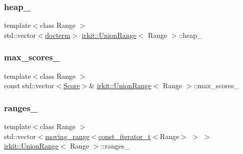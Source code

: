 \subsubsection{\texorpdfstring{heap\+\_\+}{heap\_}}
{\footnotesize\ttfamily template$<$class Range $>$ \\
std\+::vector$<$\hyperlink{structirkit_1_1UnionRange_1_1docterm}{docterm}$>$ \hyperlink{classirkit_1_1UnionRange}{irkit\+::\+Union\+Range}$<$ Range $>$\+::heap\+\_\+\hspace{0.3cm}{\ttfamily [protected]}}

\mbox{\label{classirkit_1_1UnionRange_a980f7cfaf14c7c4d93b13b6d7ce6a859}} 
\subsubsection{\texorpdfstring{max\+\_\+scores\+\_\+}{max\_scores\_}}
{\footnotesize\ttfamily template$<$class Range $>$ \\
const std\+::vector$<$\hyperlink{classirkit_1_1UnionRange_a47fb098a85581f5e33f4203e16245dae}{Score}$>$\& \hyperlink{classirkit_1_1UnionRange}{irkit\+::\+Union\+Range}$<$ Range $>$\+::max\+\_\+scores\+\_\+\hspace{0.3cm}{\ttfamily [protected]}}

\mbox{\label{classirkit_1_1UnionRange_acb9b9e969f1c90bb18bf1e4eb99f124b}} 
\subsubsection{\texorpdfstring{ranges\+\_\+}{ranges\_}}
{\footnotesize\ttfamily template$<$class Range $>$ \\
std\+::vector$<$\hyperlink{structirkit_1_1moving__range}{moving\+\_\+range}$<$\hyperlink{namespaceirkit_a4b1668583041117eb42c1b5a1091b804}{const\+\_\+iterator\+\_\+t}$<$Range$>$ $>$ $>$ \hyperlink{classirkit_1_1UnionRange}{irkit\+::\+Union\+Range}$<$ Range $>$\+::ranges\+\_\+\hspace{0.3cm}{\ttfamily [protected]}}

